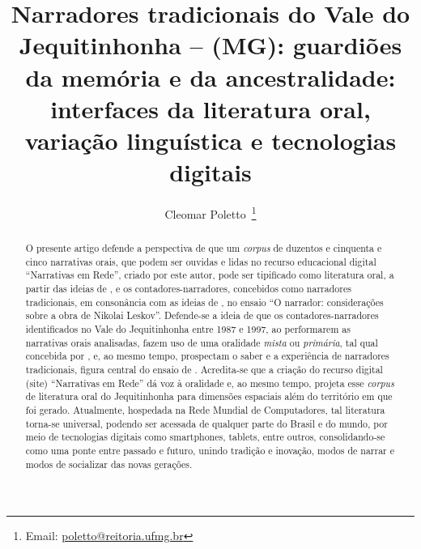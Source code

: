 \documentclass[portuguese]{textolivre}
\title{Narradores tradicionais do Vale do Jequitinhonha – (MG): guardiões da memória e da ancestralidade: interfaces da literatura oral, variação linguística e tecnologias digitais}
\author[1]{Cleomar Poletto~\orcid{0009-0008-5689-1507}\thanks{Email: \href{mailto:poletto@reitoria.ufmg.br}{poletto@reitoria.ufmg.br}}}
\affil[1]{Universidade Federal de Minas Gerais, Belo Horizonte, MG, Brasil.}
\begin{document}
\maketitle

\begin{polyabstract}
\begin{abstract}
O presente artigo defende a perspectiva de que um \textit{corpus} de duzentos e cinquenta e cinco narrativas orais, que podem ser ouvidas e lidas no recurso educacional digital “Narrativas em Rede”, criado por este autor, pode ser tipificado como literatura oral, a partir das ideias de \textcite{Cascudo1984}, e os contadores-narradores, concebidos como narradores tradicionais, em consonância com as ideias de \textcite{Benjamin1985}, no ensaio “O narrador: considerações sobre a obra de Nikolai Leskov”. Defende-se a ideia de que os contadores-narradores identificados no Vale do Jequitinhonha entre 1987 e 1997, ao performarem as narrativas orais analisadas, fazem uso de uma oralidade \textit{mista} ou \textit{primária}, tal qual concebida por \textcite{Zumthor1993}, e, ao mesmo tempo, prospectam o saber e a experiência de narradores tradicionais, figura central do ensaio de \textcite{Benjamin1985}. Acredita-se que a criação do recurso digital (site) “Narrativas em Rede” dá voz à oralidade e, ao mesmo tempo, projeta esse \textit{corpus} de literatura oral do Jequitinhonha para dimensões espaciais além do território em que foi gerado. Atualmente, hospedada na Rede Mundial de Computadores, tal literatura torna-se universal, podendo ser acessada de qualquer parte do Brasil e do mundo, por meio de tecnologias digitais como smartphones, tablets, entre outros, consolidando-se como uma ponte entre passado e futuro, unindo tradição e inovação, modos de narrar e modos de socializar das novas gerações.

\end{abstract}


\end{polyabstract}
\end{document}
